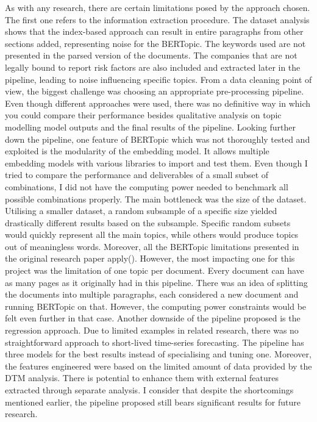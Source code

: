 \documentclass[12pt,MSc,a4paper,oneside]{muthesis}
\begin{document}
    As with any research, there are certain limitations posed by the approach chosen.
    The first one refers to the information extraction procedure. The dataset analysis shows that the index-based approach can result in entire paragraphs from other sections added, representing noise for the BERTopic. The keywords used are not presented in the parsed version of the documents. The companies that are not legally bound to report risk factors are also included and extracted later in the pipeline, leading to noise influencing specific topics.
    From a data cleaning point of view, the biggest challenge was choosing an appropriate pre-processing pipeline. Even though different approaches were used, there was no definitive way in which you could compare their performance besides qualitative analysis on topic modelling model outputs and the final results of the pipeline.
    Looking further down the pipeline, one feature of BERTopic which was not thoroughly tested and exploited is the modularity of the embedding model. It allows multiple embedding models with various libraries to import and test them. Even though I tried to compare the performance and deliverables of a small subset of combinations, I did not have the computing power needed to benchmark all possible combinations properly. The main bottleneck was the size of the dataset. Utilising a smaller dataset, a random subsample of a specific size yielded drastically different results based on the subsample. Specific random subsets would quickly represent all the main topics, while others would produce topics out of meaningless words.
    Moreover, all the BERTopic limitations presented in the original research paper apply(\cite{bertopic-latest-paper}). However, the most impacting one for this project was the limitation of one topic per document. Every document can have as many pages as it originally had in this pipeline. There was an idea of splitting the documents into multiple paragraphs, each considered a new document and running BERTopic on that. However, the computing power constraints would be felt even further in that case.
    Another downside of the pipeline proposed is the regression approach. Due to limited examples in related research, there was no straightforward approach to short-lived time-series forecasting. The pipeline has three models for the best results instead of specialising and tuning one. Moreover, the features engineered were based on the limited amount of data provided by the DTM analysis. There is potential to enhance them with external features extracted through separate analysis.
    I consider that despite the shortcomings mentioned earlier, the pipeline proposed still bears significant results for future research.
\end{document}

